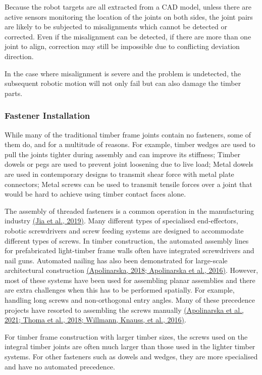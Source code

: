 \documentclass[11pt]{book}
\begin{document}
Because the robot targets are all extracted from a CAD model, unless there are active sensors monitoring the location of the joints on both sides, the joint pairs are likely to be subjected to misalignments which cannot be detected or corrected. Even if the misalignment can be detected, if there are more than one joint to align, correction may still be impossible due to conflicting deviation direction.

In the case where misalignment is severe and the problem is undetected, the subsequent robotic motion will not only fail but can also damage the timber parts. 

\subsubsection{Fastener Installation}

While many of the traditional timber frame joints contain no fasteners, some of them do, and for a multitude of reasons. For example, timber wedges are used to pull the joints tighter during assembly and can improve its stiffness; Timber dowels or pegs are used to prevent joint loosening due to live load; Metal dowels are used in contemporary designs to transmit shear force with metal plate connectors; Metal screws can be used to transmit tensile forces over a joint that would be hard to achieve using timber contact faces alone. 

The assembly of threaded fasteners is a common operation in the manufacturing industry \href{https://www.zotero.org/google-docs/?SLTLD9}{(Jia et al., 2019)}. Many different types of specialised end-effectors, robotic screwdrivers and screw feeding systems are designed to accommodate different types of screws. In timber construction, the automated assembly lines for prefabricated light-timber frame walls often have integrated screwdrivers and nail guns. Automated nailing has also been demonstrated for large-scale architectural construction \href{https://www.zotero.org/google-docs/?NCjCe0}{(Apolinarska, 2018; Apolinarska et al., 2016)}. However, most of these systems have been used for assembling planar assemblies and there are extra challenges when this has to be performed spatially. For example, handling long screws and non-orthogonal entry angles. Many of these precedence projects have resorted to assembling the screws manually \href{https://www.zotero.org/google-docs/?M7H4UY}{(Apolinarska et al., 2021; Thoma et al., 2018; Willmann, Knauss, et al., 2016)}. 

For timber frame construction with larger timber sizes, the screws used on the integral timber joints are often much larger than those used in the lighter timber systems. For other fasteners such as dowels and wedges, they are more specialised and have no automated precedence. 
\end{document}
